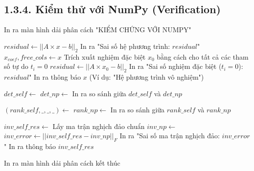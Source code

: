 \subsection*{1.3.4. Kiểm thử với NumPy (Verification)}
{}

\begin{algorithm}[H]
\caption{Kiểm chứng tính đúng đắn và sai số thuật toán với NumPy}
\label{alg:verify_solution}
\begin{algorithmic}[1]
    \State In ra màn hình dải phân cách "KIỂM CHỨNG VỚI NUMPY"
    
    \State {}
        \State $residual \gets ||A \times x - b||_2$ 
        \State In ra "Sai số hệ phương trình: $residual$"
        \State $x_{coef}, free\_cols \gets x$
        \State Trích xuất nghiệm đặc biệt $x_0$ bằng cách cho tất cả các tham số tự do $t_i = 0$
        \State $residual \gets ||A \times x_0 - b||_2$
        \State In ra "Sai số nghiệm đặc biệt ($t_i=0$): $residual$"
    \Else
        \State In ra thông báo $x$ (Ví dụ: "Hệ phương trình vô nghiệm")
    \EndIf

    \State {}
        \State $det\_self \gets$ 
        \State $det\_np \gets$ 
        \State In ra so sánh giữa $det\_self$ và $det\_np$
    \EndIf

    \State {}
    \State $(rank\_self, \_, \_, \_) \gets$ 
    \State $rank\_np \gets$ 
    \State In ra so sánh giữa $rank\_self$ và $rank\_np$

    \State {}
        \State $inv\_self\_res \gets$ 
            \State Lấy ma trận nghịch đảo chuẩn $inv\_np \gets$ 
            \State $inv\_error \gets ||inv\_self\_res - inv\_np||_F$ 
            \State In ra "Sai số ma trận nghịch đảo: $inv\_error$"
        \Else
            \State In ra thông báo $inv\_self\_res$
        \EndIf
    \EndIf
    
    \State In ra màn hình dải phân cách kết thúc
\EndProcedure
\end{algorithmic}
\end{algorithm}


